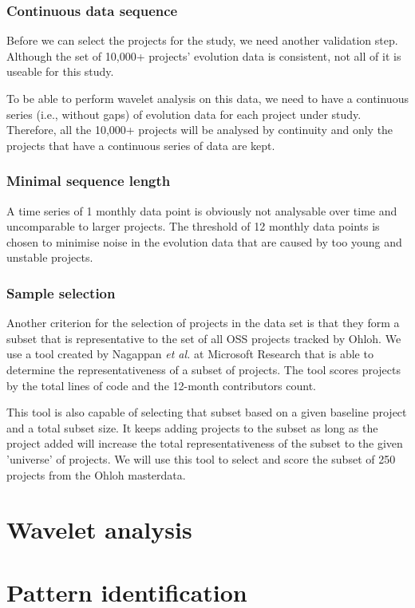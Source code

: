 \subsubsection{Continuous data sequence}
Before we can select the projects for the study, we need another validation
step. Although the set of 10,000+ projects' evolution data is consistent, not
all of it is useable for this study.

To be able to perform wavelet analysis on this data, we need to have a
continuous series (i.e., without gaps) of evolution data for each project under
study. Therefore, all the 10,000+ projects will be analysed by continuity and
only the projects that have a continuous series of data are kept.

\subsubsection{Minimal sequence length}
A time series of 1 monthly data point is obviously not analysable over time and
uncomparable to larger projects. The threshold of 12 monthly data points is
chosen to minimise noise in the evolution data that are caused by too young and
unstable projects.

\subsubsection{Sample selection}
Another criterion for the selection of projects in the data set is that they
form a subset that is representative to the set of all OSS projects tracked by
Ohloh. We use a tool created by Nagappan \emph{et al. }\rm\cite{nagappan} at
Microsoft Research that is able to determine the representativeness of a subset of
projects. The tool scores projects by the total lines of code and the 12-month
contributors count.

This tool is also capable of selecting that subset based on a given baseline
project and a total subset size. It keeps adding projects to the subset as long
as the project added will increase the total representativeness of the subset
to the given 'universe' of projects. We will use this tool to select and score
the subset of 250 projects from the Ohloh masterdata.



\section{Wavelet analysis}

\section{Pattern identification}

